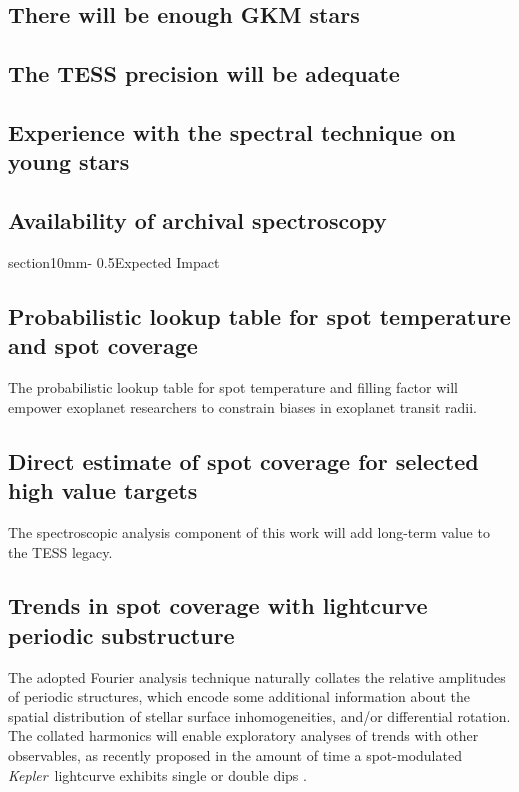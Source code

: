 \documentclass[letterpaper,11pt]{article}
\makeatletter
\renewcommand{\section}{\@startsection%
{section}{1}{0mm}{-\baselineskip}%
{0.5\baselineskip}{\normalfont\Large\bfseries}}%
\newcommand{\kepler}{{\it Kepler}}
\makeatother
\begin{document}
\subsection{There will be enough GKM stars}
\subsection{The TESS precision will be adequate}
\subsection{Experience with the spectral technique on young stars}
\subsection{Availability of archival spectroscopy}

\section{Expected Impact}

\subsection{Probabilistic lookup table for spot temperature and spot coverage}
The probabilistic lookup table for spot temperature and filling factor will empower exoplanet researchers to constrain biases in exoplanet transit radii.

\subsection{Direct estimate of spot coverage for selected high value targets}
The spectroscopic analysis component of this work will add long-term value to the TESS legacy.

\subsection{Trends in spot coverage with lightcurve periodic substructure}
The adopted Fourier analysis technique naturally collates the relative amplitudes of periodic structures, which encode some additional information about the spatial distribution of stellar surface inhomogeneities, and/or differential rotation.  The collated harmonics will enable exploratory analyses of trends with other observables, as recently proposed in the amount of time a spot-modulated \kepler\ lightcurve exhibits single or double dips \citep{2018ApJ...863..190B}.
\end{document}
